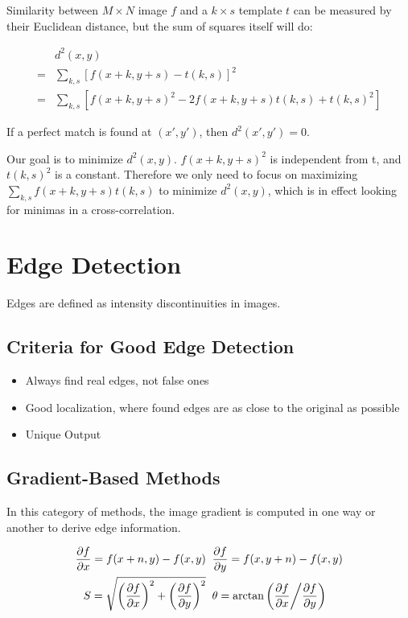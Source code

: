 \documentclass{article}
\begin{document}
\begin{multicols}{3}
Similarity between $M \times N$ image $f$ and a $k \times s$ template $t$ can be measured by their Euclidean distance, but the sum of squares itself will do:

\[
\begin{aligned}
  &d^2(x,y)\\
  =&\sum_{k,s}[f(x+k,y+s) - t(k,s)]^2 \\
  =&\sum_{k,s}[f(x+k,y+s)^2 -2f(x+k,y+s)t(k,s) + t(k,s)^2]
\end{aligned}
\]

If a perfect match is found at $(x',y')$, then $d^2(x',y') = 0$.

Our goal is to minimize $d^2(x,y)$. $f(x+k,y+s)^2$ is independent from t, and $t(k,s)^2$ is a constant. Therefore we only need to focus on maximizing $\sum_{k,s}f(x+k,y+s)t(k,s)$ to minimize $d^2(x,y)$, which is in effect looking for minimas in a cross-correlation.

\section{Edge Detection}

Edges are defined as intensity discontinuities in images.

\subsection{Criteria for Good Edge Detection}
\begin{itemize}
\itemsep0em
\item Always find real edges, not false ones
\item Good localization, where found edges are as close to the original as possible  
\item Unique Output
\end{itemize}

\subsection{Gradient-Based Methods}

In this category of methods, the image gradient is computed in one way or another to derive edge information.

\[
\begin{aligned}
  \frac{\partial f}{\partial x} = f(x+n, y) - f(x,y) \;& \;\frac{\partial f}{\partial y} = f(x, y+n) - f(x,y)\\
  S = \sqrt{\left(\frac{\partial f}{\partial x}\right)^2 + \left(\frac{\partial f}{\partial y}\right)^2} \;&\; \theta = \arctan\left(\frac{\partial f}{\partial x} \middle/ \frac{\partial f}{\partial y}\right)
\end{aligned}
\]


\end{multicols}
\end{document}
